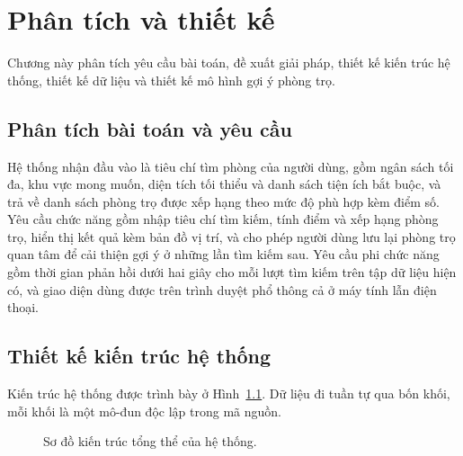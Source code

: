 \chapter{Phân tích và thiết kế}
\label{ch:thietke}

\begin{muctieu}
Chương này phân tích yêu cầu bài toán, đề xuất giải pháp, thiết kế kiến trúc
hệ thống, thiết kế dữ liệu và thiết kế mô hình gợi ý phòng trọ.
\end{muctieu}

\section{Phân tích bài toán và yêu cầu}

Hệ thống nhận đầu vào là tiêu chí tìm phòng của người dùng, gồm ngân sách
tối đa, khu vực mong muốn, diện tích tối thiểu và danh sách tiện ích bắt
buộc, và trả về danh sách phòng trọ được xếp hạng theo mức độ phù hợp kèm
điểm số. Yêu cầu chức năng gồm nhập tiêu chí tìm kiếm, tính điểm và xếp
hạng phòng trọ, hiển thị kết quả kèm bản đồ vị trí, và cho phép người dùng
lưu lại phòng trọ quan tâm để cải thiện gợi ý ở những lần tìm kiếm sau. Yêu
cầu phi chức năng gồm thời gian phản hồi dưới hai giây cho mỗi lượt tìm
kiếm trên tập dữ liệu hiện có, và giao diện dùng được trên trình duyệt phổ
thông cả ở máy tính lẫn điện thoại.

\section{Thiết kế kiến trúc hệ thống}

Kiến trúc hệ thống được trình bày ở Hình~\ref{fig:kientruc}. Dữ liệu đi
tuần tự qua bốn khối, mỗi khối là một mô-đun độc lập trong mã nguồn.

\begin{figure}[H]
\centering
{}
\caption{Sơ đồ kiến trúc tổng thể của hệ thống.}
\label{fig:kientruc}
\end{figure}

